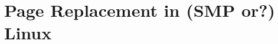 \documentclass{article}
\begin{document}
\section[3]{Page Replacement in (SMP or?) Linux}
% 





\printbibliography
\end{document}
